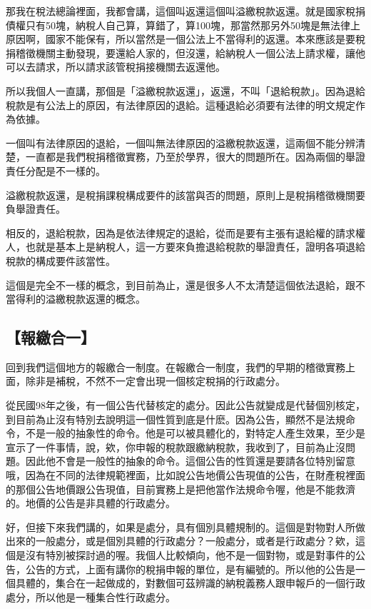 \documentclass[oneside,sub3section]{ctexbook}
\begin{document}
那我在稅法總論裡面，我都會講，這個叫返還這個叫溢繳稅款返還。就是國家稅捐債權只有50塊，納稅人自己算，算錯了，算100塊，那當然那另外50塊是無法律上原因啊，國家不能保有，所以當然是一個公法上不當得利的返還。本來應該是要稅捐稽徵機關主動發現，要還給人家的，但沒還，給納稅人一個公法上請求權，讓他可以去請求，所以請求該管稅捐接機關去返還他。

所以我個人一直講，那個是「溢繳稅款返還」，返還，不叫「退給稅款」。因為退給稅款是有公法上的原因，有法律原因的退給。這種退給必須要有法律的明文規定作為依據。

一個叫有法律原因的退給，一個叫無法律原因的溢繳稅款返還，這兩個不能分辨清楚，一直都是我們稅捐稽徵實務，乃至於學界，很大的問題所在。因為兩個的舉證責任分配是不一樣的。

溢繳稅款返還，是稅捐課稅構成要件的該當與否的問題，原則上是稅捐稽徵機關要負舉證責任。

相反的，退給稅款，因為是依法律規定的退給，從而是要有主張有退給權的請求權人，也就是基本上是納稅人，這一方要來負擔退給稅款的舉證責任，證明各項退給稅款的構成要件該當性。

這個是完全不一樣的概念，到目前為止，還是很多人不太清楚這個依法退給，跟不當得利的溢繳稅款返還的概念。

\hypertarget{ux5831ux7e73ux5408ux4e00}{%
\subsection{【報繳合一】}\label{ux5831ux7e73ux5408ux4e00}}

回到我們這個地方的報繳合一制度。在報繳合一制度，我們的早期的稽徵實務上面，除非是補稅，不然不一定會出現一個核定稅捐的行政處分。

從民國98年之後，有一個公告代替核定的處分。因此公告就變成是代替個別核定，到目前為止沒有特別去說明這一個性質到底是什麽。因為公告，顯然不是法規命令，不是一般的抽象性的命令。他是可以被具體化的，對特定人產生效果，至少是宣示了一件事情，說，欸，你申報的稅款跟繳納稅款，我收到了，目前為止沒問題。因此他不會是一般性的抽象的命令。這個公告的性質還是要請各位特別留意哦，因為在不同的法律規範裡面，比如說公告地價公告現值的公告，在財產稅裡面的那個公告地價跟公告現值，目前實務上是把他當作法規命令喔，他是不能救濟的。地價的公告是非具體的行政處分。

好，但接下來我們講的，如果是處分，具有個別具體規制的。這個是對物對人所做出來的一般處分，或是個別具體的行政處分？一般處分，或者是行政處分？欸，這個是沒有特別被探討過的喔。我個人比較傾向，他不是一個對物，或是對事件的公告，公告的方式，上面有講你的稅捐申報的單位，是有編號的。所以他的公告是一個具體的，集合在一起做成的，對數個可茲辨識的納稅義務人跟申報戶的一個行政處分，所以他是一種集合性行政處分。
\end{document}
